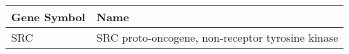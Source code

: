 \begin{tabular}{ll}
\toprule
Gene Symbol &                                             Name \\
\midrule
        SRC & SRC proto-oncogene, non-receptor tyrosine kinase \\
\bottomrule
\end{tabular}
